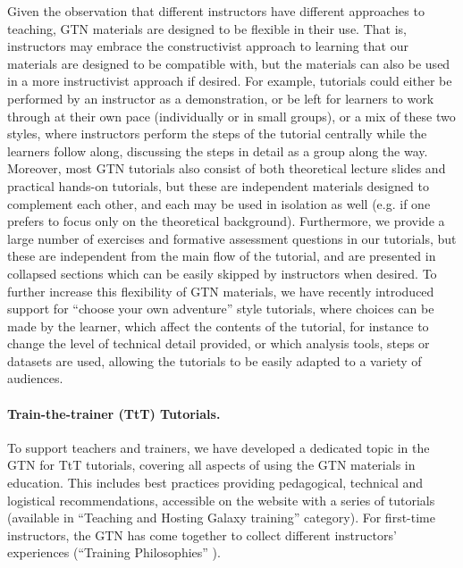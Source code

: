 Given the observation that different instructors have different approaches to teaching, GTN materials are designed to be flexible in their use. That is, instructors may embrace the constructivist approach to learning that our materials are designed to be compatible with, but the materials can also be used in a more instructivist approach if desired. For example, tutorials could either be performed by an instructor as a demonstration, or be left for learners to work through at their own pace (individually or in small groups), or a mix of these two styles, where instructors perform the steps of the tutorial centrally while the learners follow along, discussing the steps in detail as a group along the way. Moreover, most GTN tutorials also consist of both theoretical lecture slides and practical hands-on tutorials, but these are independent materials designed to complement each other, and each may be used in isolation as well (e.g. if one prefers to focus only on the theoretical background). Furthermore, we provide a large number of exercises and formative assessment questions in our tutorials, but these are independent from the main flow of the tutorial, and are presented in collapsed sections which can be easily skipped by instructors when desired. To further increase this flexibility of GTN materials, we have recently introduced support for ``choose your own adventure'' style tutorials, where choices can be made by the learner, which affect the contents of the tutorial, for instance to change the level of technical detail provided, or which analysis tools, steps or datasets are used, allowing the tutorials to be easily adapted to a variety of audiences. 


\paragraph{Train-the-trainer (TtT) Tutorials.}
To support teachers and trainers, we have developed a dedicated topic in the GTN for TtT tutorials, covering all aspects of using the GTN materials in education. This includes best practices providing pedagogical, technical and logistical recommendations, accessible on the website with a series of tutorials (available in ``Teaching and Hosting Galaxy training'' category). For first-time instructors, the GTN has come together to collect different instructors' experiences (``Training Philosophies'' \cite{gtn-philosophies}).

